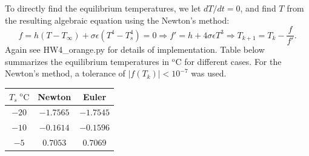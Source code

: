 \documentclass[12pt]{article}
\begin{document}
\begin{ex}
\begin{solution}
  To directly find the equilibrium temperatures, we let $dT/dt=0$, and find $T$ from the resulting algebraic equation using the Newton's method:
  $$f=h(T-T_{\infty})+\sigma\epsilon(T^4-T_s^4)=0\Rightarrow f'=h+4\sigma\epsilon T^3\Rightarrow T_{k+1}=T_k-\frac{f}{f'}.$$
  Again see HW4\_orange.py for details of implementation. Table below summarizes the equilibrium temperatures in $\mathrm{^oC}$ for different cases. For the Newton's method, a tolerance of $|f(T_k)|<10^{-7}$ was used.
  \begin{center}
    \begin{tabular}{ c | c  c }
      $T_s\;\mathrm{^oC}$ & Newton & Euler\\
      \hline
      $-20$ & $-1.7565$ & $-1.7545$ \\
      $-10$ & $-0.1614$ & $-0.1596$ \\
      $-5$  & $0.7053$ & $0.7069$ \\
    \end{tabular}
\end{center}


\end{solution}
\end{ex}
\end{document}
